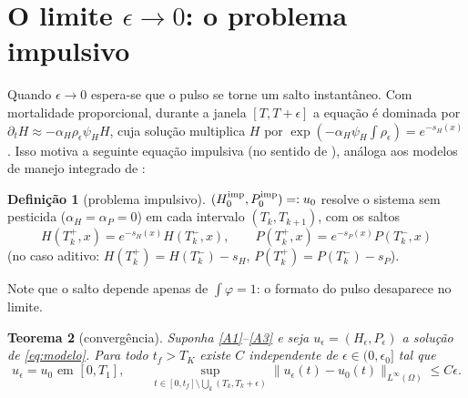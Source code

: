 \documentclass[11pt,a4paper]{article}
\numberwithin{equation}{section}
\newtheorem{teorema}{Teorema}[section]
\theoremstyle{definition}
\newtheorem{definicao}[teorema]{Definição}
\theoremstyle{remark}
\begin{document}
\section{O limite $\epsilon\to0$: o problema impulsivo}\label{sec:limite}

Quando $\epsilon\to0$ espera-se que o pulso se torne um salto instantâneo. Com mortalidade
proporcional, durante a janela $[T,T+\epsilon]$ a equação é dominada por
$\partial_tH\approx-\alpha_H\rho_\epsilon\psi_H H$, cuja solução multiplica $H$ por
$\exp(-\alpha_H\psi_H\int\rho_\epsilon)=e^{-s_H(x)}$. Isso motiva a seguinte equação impulsiva (no sentido de \cite{Lakshmikantham}), análoga aos modelos de manejo integrado de \cite{Tang}:

\begin{definicao}[problema impulsivo]
$(H_0^{\rm imp},P_0^{\rm imp})=:u_0$ resolve o sistema sem pesticida
($\alpha_H=\alpha_P=0$) em cada intervalo $(T_k,T_{k+1})$, com os saltos
\begin{equation}\label{eq:salto}
H(T_k^+,x)=e^{-s_H(x)}H(T_k^-,x),\qquad P(T_k^+,x)=e^{-s_P(x)}P(T_k^-,x)
\end{equation}
(no caso aditivo: $H(T_k^+)=H(T_k^-)-s_H$, $P(T_k^+)=P(T_k^-)-s_P$).
\end{definicao}

Note que o salto depende apenas de $\int\varphi=1$: o formato do pulso desaparece no limite.

\begin{teorema}[convergência]\label{teo:limite}
Suponha \ref{A1}--\ref{A3} e seja $u_\epsilon=(H_\epsilon,P_\epsilon)$ a solução de
\eqref{eq:modelo}. Para todo $t_f>T_K$ existe $C$ independente de $\epsilon\in(0,\epsilon_0]$ tal que
\begin{equation}\label{eq:conv}
u_\epsilon=u_0 \text{ em } [0,T_1],\qquad
\sup_{t\in[0,t_f]\setminus\bigcup_k(T_k,T_k+\epsilon)}\|u_\epsilon(t)-u_0(t)\|_{L^\infty(\Omega)}\le C\epsilon .
\end{equation}
\end{teorema}
\end{document}
